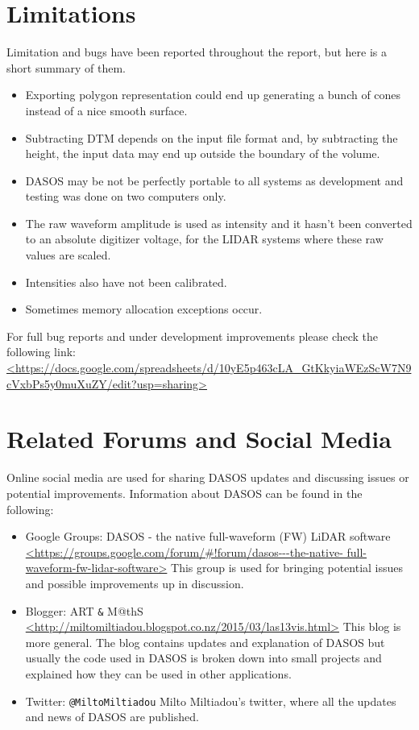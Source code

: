 \documentclass{subfiles}
\begin{document}
	  	
		
	\section{Limitations}
	    Limitation and bugs have been reported throughout the report, but here is a short summary of them. 
	    \begin{itemize}
	    \item Exporting polygon representation could end up generating a bunch of cones instead of a nice smooth surface. 
	    \item Subtracting DTM depends on the input file format and, by subtracting the height, the input data may end up outside the boundary of the volume.
	    \item DASOS may be not be perfectly portable to all systems as development and testing was done on two computers only.	     
	    \item The raw waveform amplitude is used as intensity and it hasn't been converted to an absolute digitizer voltage, for the LIDAR systems where these raw values are scaled.
   	    \item Intensities also have not been calibrated.
	    \item Sometimes memory allocation exceptions occur.
  	    \end{itemize}
	    For full bug reports and under development improvements please check the following link:\newline
	    \url{<https://docs.google.com/spreadsheets/d/10yE5p463cLA_GtKkyiaWEzScW7N9cVxbPs5y0muXuZY/edit?usp=sharing>}
	    
	\section{Related Forums and Social Media}
	    Online social media are used for sharing DASOS updates and discussing issues or potential improvements. Information about DASOS can be found in the following:
	    \begin{itemize}
	    \item Google Groups: DASOS - the native full-waveform (FW) LiDAR software\newline
	    \url{<https://groups.google.com/forum/#!forum/dasos---the-native- full-waveform-fw-lidar-software>}\newline
	    This group is used for bringing potential issues and possible improvements up in discussion.
	    \item Blogger: ART \verb|&| M@thS\newline
	    \url{<http://miltomiltiadou.blogspot.co.nz/2015/03/las13vis.html>}\newline
	    This blog is more general. The blog contains updates and explanation of DASOS but usually the code used in DASOS is broken down into small projects and explained how they can be used in other applications.
	    \item Twitter: \verb|@MiltoMiltiadou|\newline
	    Milto Miltiadou's twitter, where all the updates and news of DASOS are published.  
	    \end{itemize}	
	    
\end{document}
